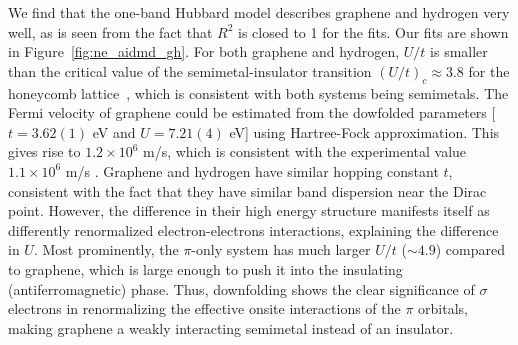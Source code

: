 We find that the one-band Hubbard model describes graphene and hydrogen very well, as is seen from the fact that $R^2$ is closed to 1 for the fits. Our fits are shown in Figure~\ref{fig:ne_aidmd_gh}.
For both graphene and hydrogen, $U/t$ is smaller than the critical value of the 
semimetal-insulator transition $(U/t)_c \approx 3.8$ for the honeycomb lattice~\cite{Sorella2012}, 
which is consistent with both systems being semimetals. The Fermi velocity of graphene could be estimated from the dowfolded parameters [$t=3.62(1)$ eV and $U=7.21(4)$ eV] using Hartree-Fock approximation. 
This gives rise to $1.2\times 10^{6}$ m/s, which is consistent with the experimental value $1.1 \times 10^6$ m/s \cite{Siegel2011}. Graphene and hydrogen have similar hopping constant $t$, 
consistent with the fact that they have similar band dispersion near the Dirac point. 
However, the difference in their high energy structure manifests itself as differently renormalized electron-electrons interactions, 
explaining the difference in $U$. Most prominently, the $\pi$-only system has much larger $U/t$ ($\sim4.9$) compared to graphene, 
which is large enough to push it into the insulating (antiferromagnetic) phase.
Thus, downfolding shows the clear significance of $\sigma$ electrons in renormalizing the effective onsite interactions of the $\pi$ orbitals, making graphene a weakly interacting semimetal instead of an insulator.  

